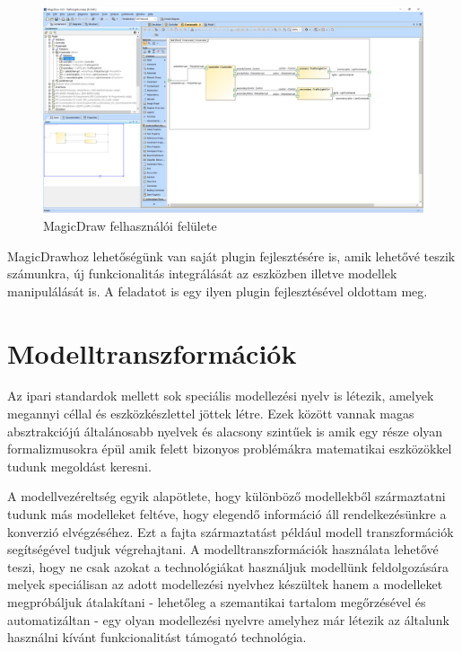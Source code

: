 \begin{figure}[!ht]
	\centering
	\includegraphics[width=140mm, keepaspectratio]{figures/preliminaries/md-gui.png}
	\caption{MagicDraw felhasználói felülete}
	\label{fig:md-gui}
\end{figure}

MagicDrawhoz lehetőségünk van saját plugin fejlesztésére is, amik lehetővé teszik számunkra, új funkcionalitás integrálását az eszközben illetve modellek manipulálását is. A feladatot is egy ilyen plugin fejlesztésével oldottam meg.


\section{Modelltranszformációk}

Az ipari standardok mellett sok speciális modellezési nyelv is létezik, amelyek megannyi céllal és eszközkészlettel jöttek létre. Ezek között vannak magas absztrakciójú általánosabb nyelvek és alacsony szintűek is amik egy része olyan formalizmusokra épül amik felett bizonyos problémákra matematikai eszközökkel tudunk megoldást keresni.

A modellvezéreltség egyik alapötlete, hogy különböző modellekből származtatni tudunk más modelleket feltéve, hogy elegendő információ áll rendelkezésünkre a konverzió elvégzéséhez. Ezt a fajta származtatást például modell transzformációk segítségével tudjuk végrehajtani. A modelltranszformációk használata lehetővé teszi, hogy ne csak azokat a technológiákat használjuk modellünk feldolgozására melyek speciálisan az adott modellezési nyelvhez készültek hanem a modelleket megpróbáljuk átalakítani - lehetőleg a szemantikai tartalom megőrzésével és automatizáltan - egy olyan modellezési nyelvre amelyhez már létezik az általunk használni kívánt funkcionalitást támogató technológia.

